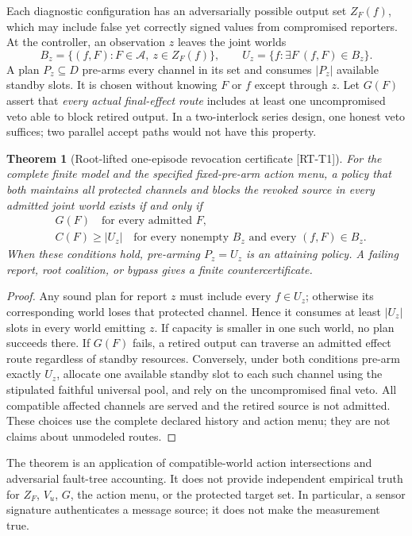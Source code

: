 \documentclass[11pt,a4paper]{article}
\newtheorem{theorem}{Theorem}
\theoremstyle{definition}\newtheorem{definition}{Definition}
\newcommand{\idtag}[1]{\textnormal{\textsf{[#1]}}}
\begin{document}
Each diagnostic configuration has an adversarially possible output set $Z_F(f)$, which may include false yet correctly signed values from compromised reporters. At the controller, an observation $z$ leaves the joint worlds
\begin{equation}\label{eq:root-cell}
B_z=\{(f,F):F\in\mathcal A,\ z\in Z_F(f)\},\qquad
U_z=\{f:\exists F\ (f,F)\in B_z\}.
\end{equation}
A plan $P_z\subseteq D$ pre-arms every channel in its set and consumes $|P_z|$ available standby slots. It is chosen without knowing $F$ or $f$ except through $z$. Let $G(F)$ assert that \emph{every actual final-effect route} includes at least one uncompromised veto able to block retired output. In a two-interlock series design, one honest veto suffices; two parallel accept paths would not have this property.

\begin{theorem}[Root-lifted one-episode revocation certificate \idtag{RT-T1}]
\label{thm:root-certificate}
For the complete finite model and the specified fixed-pre-arm action menu, a policy that both maintains all protected channels and blocks the revoked source in every admitted joint world exists if and only if
\begin{align}\label{eq:root-certificate}
& G(F)\quad\text{for every admitted }F,\\
& C(F)\ge |U_z|\quad\text{for every nonempty }B_z\text{ and every }(f,F)\in B_z.
\end{align}
When these conditions hold, pre-arming $P_z=U_z$ is an attaining policy. A failing report, root coalition, or bypass gives a finite countercertificate.
\end{theorem}
\begin{proof}
Any sound plan for report $z$ must include every $f\in U_z$; otherwise its corresponding world loses that protected channel. Hence it consumes at least $|U_z|$ slots in every world emitting $z$. If capacity is smaller in one such world, no plan succeeds there. If $G(F)$ fails, a retired output can traverse an admitted effect route regardless of standby resources. Conversely, under both conditions pre-arm exactly $U_z$, allocate one available standby slot to each such channel using the stipulated faithful universal pool, and rely on the uncompromised final veto. All compatible affected channels are served and the retired source is not admitted. These choices use the complete declared history and action menu; they are not claims about unmodeled routes.
\end{proof}
The theorem is an application of compatible-world action intersections and adversarial fault-tree accounting. It does not provide independent empirical truth for $Z_F$, $V_u$, $G$, the action menu, or the protected target set. In particular, a sensor signature authenticates a message source; it does not make the measurement true.
\end{document}
